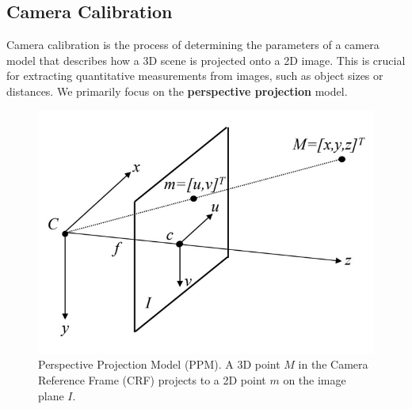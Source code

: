 




\subsection{Camera Calibration}

Camera calibration is the process of determining the parameters of a camera model that describes how a 3D scene is projected onto a 2D image. This is crucial for extracting quantitative measurements from images, such as object sizes or distances. We primarily focus on the \textbf{perspective projection} model.

\begin{figure}[htbp]
  \centering
  \includegraphics[width=0.5\linewidth]{./img/camera_calibration.jpg}
  \caption{Perspective Projection Model (PPM). A 3D point $M$ in the Camera Reference Frame (CRF) projects to a 2D point $m$ on the image plane $I$.}
\end{figure}

